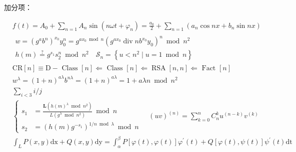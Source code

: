 \documentclass{article}
\begin{document}
加分项：  

    \begin{align}
        &f(t)=A_{0}+\sum_{n=1} A_{n} \sin \left(n \omega t+\varphi_{n}\right)=\frac{a_{0}}{2}+\sum_{n=1}\left(a_{n} \cos n x+b_{n} \sin n x\right)\\
        &\begin{array}{l}
        w=\left(g^{a} b^{n}\right)^{x_{0}} y_{0}^{n}=g^{a x_{0} \bmod n}\left(g^{a x_{0}} \operatorname{div} n b^{x_{0}} y_{0}\right)^{n} \bmod n^{2} \\
        h(m) \stackrel{?}{=} g^{s_{1}} s_{2}^{n} \bmod n^{2} \quad \mathcal{S}_{n}=\left\{u<n^{2} \mid u=1 \bmod n\right\}
        \end{array}\\
        &\mathrm{CR}[n] \equiv \mathrm{D}-\text { Class }[n] \Leftarrow \text { Class }[n] \Leftarrow \operatorname{RSA}[n, n] \Leftarrow \text { Fact }[n]\\
        &w^{\lambda}=(1+n)^{a \lambda} b^{n \lambda}=(1+n)^{a \lambda}=1+a \lambda n \bmod n^{2}\\
        &\sum_{i<3} i / j\\
        &\left\{\begin{array}{rl}
        s_{1} & =\frac{\mathbf{L}\left(h(m)^{\lambda} \bmod n^{2}\right)}{L\left(g^{\lambda} \bmod n^{2}\right)} \bmod n \\
        s_{2} & =\left(h(m) g^{-s_{1}}\right)^{1 / n \bmod \lambda} \bmod n
        \end{array} \quad(u v)^{(n)}=\sum_{k=0}^{n} C_{n}^{k} u^{(n-k)} v^{(k)}\right.\\
        &\int_{L} P(x, y) \mathrm{d} \mathrm{x}+Q(x, y) \mathrm{d} \mathrm{y}=\int_{\alpha}^{\beta} P[\varphi(t), \varphi(t)] \varphi^{\prime}(t)+Q[\varphi(t), \psi(t)] \psi^{\prime}(t) \mathrm{dt}
    \end{align}
\end{document}
